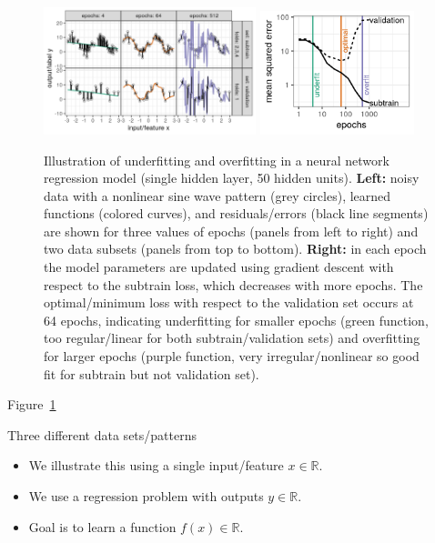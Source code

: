 \documentclass[12pt]{article}
\begin{document}
\begin{figure}
  \centering
  \includegraphics[width=0.55\textwidth]{figure-overfitting-paper}
  \includegraphics[width=0.4\textwidth]{figure-overfitting-paper-loss}   
  \caption{Illustration of underfitting and overfitting in a neural
    network regression model (single hidden layer, 50 hidden
    units). \textbf{Left:} noisy data with a nonlinear sine wave
    pattern (grey circles), learned functions (colored curves), and
    residuals/errors (black line segments) are shown for three values
    of epochs (panels from left to right) and two data subsets (panels
    from top to bottom). \textbf{Right:} in each epoch the model
    parameters are updated using gradient descent with respect to the
    subtrain loss, which decreases with more epochs. The
    optimal/minimum loss with respect to the validation set occurs at
    64 epochs, indicating underfitting for smaller epochs (green
    function, too regular/linear for both subtrain/validation sets)
    and overfitting for larger epochs (purple function, very
    irregular/nonlinear so good fit for subtrain but not validation
    set).}
  \label{fig:overfitting-paper}
\end{figure}

Figure~\ref{fig:overfitting-paper}



{Three different data sets/patterns}
\begin{itemize}
\item We illustrate this using a single input/feature
  $x\in\mathbb R$.
\item We use a regression problem with outputs $y\in\mathbb R$.
\item Goal is to learn a function $f(x)\in\mathbb R$.
\end{itemize}
\end{document}
